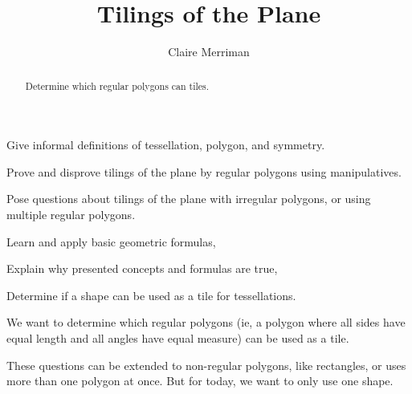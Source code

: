 \documentclass[noauthor,nooutcomes,handout]{../ximera}
\title{Tilings of the Plane}
\author{Claire Merriman}
\begin{document}
\begin{abstract}
Determine which regular polygons can tiles.
\end{abstract}
\maketitle

\begin{listOutcomes}
 \item Give informal definitions of tessellation, polygon, and symmetry.
\item Prove and disprove tilings of the plane by regular polygons using manipulatives.
\item Pose questions about tilings of the plane with irregular polygons, or using multiple regular polygons.
\end{listOutcomes}

\begin{listObjectives}
 \item Learn and apply basic geometric formulas,
\item Explain why presented concepts and formulas are true,
\item Determine if a shape can be used as a tile for tessellations.
\end{listObjectives}

 We want to determine which regular polygons (ie, a polygon where all sides have equal length and all angles have equal measure) can be used as a tile.
 
 These questions can be extended to non-regular polygons, like rectangles, or uses more than one polygon at once. But for today, we want to only use one shape.
\end{document}
